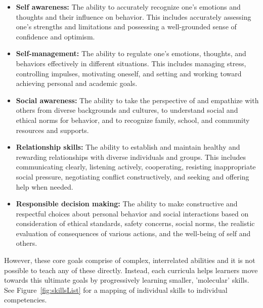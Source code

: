 \documentclass[prodmode,acmtochi]{acmsmall}
\newcommand{\todo}[1]{\textrm{\textrm{\textcolor{LightBlue}{[[#1]]} } } }
\begin{document}
%
%
\begin{itemize}
        \item {\bf Self awareness: }
                        The ability to accurately recognize one’s emotions and thoughts and their influence on behavior. This includes accurately assessing one’s strengths and limitations and possessing a well-grounded sense of confidence and optimism.
        \item {\bf Self-management: }
                         The ability to regulate one’s emotions, thoughts, and behaviors effectively in different situations. This includes managing stress, controlling impulses, motivating oneself, and setting and working toward achieving personal and academic goals.
        \item {\bf Social awareness: }
                         The ability to take the perspective of and empathize with others from diverse backgrounds and cultures, to understand social and ethical norms for behavior, and to recognize family, school, and community resources and supports.
        \item {\bf Relationship skills: }
                        The ability to establish and maintain healthy and rewarding relationships with diverse individuals and groups. This includes communicating clearly, listening actively, cooperating, resisting inappropriate social pressure, negotiating conflict constructively, and seeking and offering help when needed.
        \item {\bf Responsible decision making: }
                        The ability to make constructive and respectful choices about personal behavior and social interactions based on consideration of ethical standards, safety concerns, social norms, the realistic evaluation of consequences of various actions, and the well-being of self and others.
\end{itemize}
However, these core goals comprise of complex, interrelated abilities and it is not possible to teach any of these directly. Instead, each curricula helps learners move towards this ultimate goals by progressively learning smaller, 'molecular' skills. See Figure~\ref{fig:skillsList} for a mapping of individual skills to individual competencies. 

\end{document}
